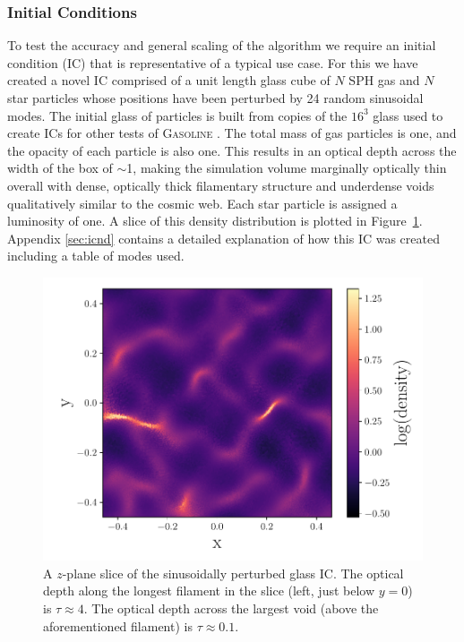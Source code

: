 \documentclass[fleq,usenatbib]{mnras}
\begin{document}
{\subsubsection{Initial Conditions}
To test the accuracy and general scaling of the algorithm we require an 
initial condition (IC) that is representative of a typical use case. For this 
we have created a novel IC comprised of a unit length glass cube of $N$ SPH gas and 
$N$ star particles whose positions have been perturbed by 24 random sinusoidal 
modes. The initial glass of particles is built from copies of the $16^3$ glass 
used to create ICs for other tests of \textsc{Gasoline} 
\citep{wadsleyEt17}. The total mass of gas particles is one, and the opacity 
of each particle is also one. This results in an optical depth across the 
width of the box of $\sim$1, making the simulation volume marginally  optically thin 
overall with dense, optically thick filamentary structure and underdense voids 
qualitatively similar to the cosmic web. Each star particle is assigned a 
luminosity of one. A slice of this density distribution is plotted in 
Figure~\ref{fig:sine_rho}. Appendix \ref{sec:icnd} contains a detailed 
explanation of how this IC was created including a table of modes used.
\begin{figure}
\includegraphics[width=1\linewidth]{Figures/sine_rho.pdf}
\caption{A $z$-plane slice of the sinusoidally perturbed glass IC. The optical 
depth along the longest filament in the slice (left, just below $y=0$) is
$\tau\approx 4$. The optical depth across the largest void (above the 
aforementioned filament) is $\tau\approx 0.1$.}
\label{fig:sine_rho}
\end{figure}

}
\end{document}
